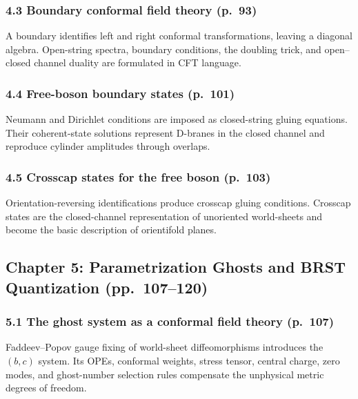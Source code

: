 \documentclass[
  10pt,
  a4paper,
  openany]{book}
\begin{document}
\subsubsection{4.3 Boundary conformal field theory
(p.~93)}\label{boundary-conformal-field-theory-p.-93}

A boundary identifies left and right conformal transformations, leaving
a diagonal algebra. Open-string spectra, boundary conditions, the
doubling trick, and open--closed channel duality are formulated in CFT
language.

\subsubsection{4.4 Free-boson boundary states
(p.~101)}\label{free-boson-boundary-states-p.-101}

Neumann and Dirichlet conditions are imposed as closed-string gluing
equations. Their coherent-state solutions represent D-branes in the
closed channel and reproduce cylinder amplitudes through overlaps.

\subsubsection{4.5 Crosscap states for the free boson
(p.~103)}\label{crosscap-states-for-the-free-boson-p.-103}

Orientation-reversing identifications produce crosscap gluing
conditions. Crosscap states are the closed-channel representation of
unoriented world-sheets and become the basic description of orientifold
planes.

\subsection{Chapter 5: Parametrization Ghosts and BRST Quantization
(pp.~107--120)}\label{chapter-5-parametrization-ghosts-and-brst-quantization-pp.-107120}

\subsubsection{5.1 The ghost system as a conformal field theory
(p.~107)}\label{the-ghost-system-as-a-conformal-field-theory-p.-107}

Faddeev--Popov gauge fixing of world-sheet diffeomorphisms introduces
the \((b,c)\) system. Its OPEs, conformal weights, stress tensor,
central charge, zero modes, and ghost-number selection rules compensate
the unphysical metric degrees of freedom.
\end{document}
